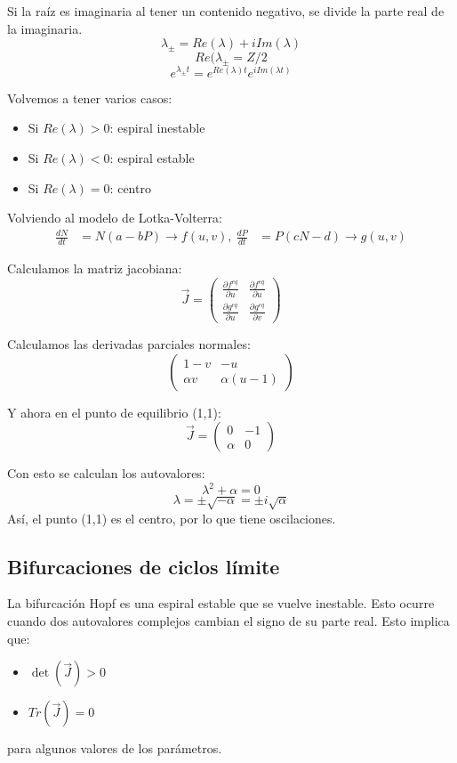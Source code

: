 Si la raíz es imaginaria al tener un contenido negativo, se divide la parte real de la imaginaria. 
$$\lambda_{\pm} = Re(\lambda) + iIm(\lambda)$$
$$Re(\lambda_{\pm} = Z/2$$
$$e^{\lambda_{\pm} t} = e^{Re(\lambda) t} e^{i Im(\lambda t)}$$

Volvemos a tener varios casos:
\begin{itemize}
\item Si $Re (\lambda) > 0$: espiral inestable
\item Si $Re(\lambda) < 0$: espiral estable
\item Si $Re(\lambda) = 0$: centro
\end{itemize}

Volviendo al modelo de Lotka-Volterra:
\begin{align*}
\frac{dN}{dt} &= N(a - bP) \rightarrow f(u,v), \
\frac{dP}{dt} &= P(cN - d) \rightarrow g(u, v)
\end{align*}

Calculamos la matriz jacobiana:
$$\vec{J} = \begin{pmatrix}
\frac{\partial f^{eq}}{\partial u} & \frac{\partial f^{eq}}{\partial u} \\
\frac{\partial g^{eq}}{\partial u} & \frac{\partial g^{eq}}{\partial v}
\end{pmatrix}$$

Calculamos las derivadas parciales normales:
$$ \begin{pmatrix}
1 - v & -u \\
\alpha v & \alpha(u - 1)
\end{pmatrix} $$

Y ahora en el punto de equilibrio (1,1):
$$\vec{J} = \begin{pmatrix}
0 & -1 \\ \alpha & 0
\end{pmatrix}$$

Con esto se calculan los autovalores:
$$\lambda^2 + \alpha = 0$$
$$\lambda = \pm \sqrt{- \alpha} = \pm i\sqrt{\alpha}$$
Así, el punto (1,1) es el centro, por lo que tiene oscilaciones.

\subsection{Bifurcaciones de ciclos límite}
La bifurcación Hopf es una espiral estable que se vuelve inestable. Esto ocurre cuando dos autovalores complejos cambian el signo de su parte real. Esto implica que:
\begin{itemize}
\item $\det (\vec{J}) > 0$
\item $Tr(\vec{J}) = 0$
\end{itemize}
para algunos valores de los parámetros.